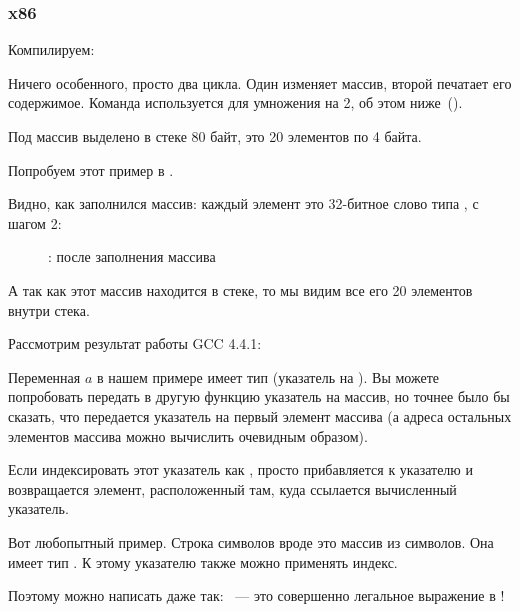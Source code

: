 \subsubsection{x86}


Компилируем:



Ничего особенного, просто два цикла. Один изменяет массив, второй печатает его содержимое. 
Команда  используется для умножения \ECX на 2, об этом ниже~().

Под массив выделено в стеке 80 байт, это 20 элементов по 4 байта.

\clearpage
Попробуем этот пример в \olly.
\myindex{\olly}

Видно, как заполнился массив: каждый элемент это 32-битное слово типа \Tint, с шагом 2:

\begin{figure}[H]
\centering
{}
\caption{\olly: после заполнения массива}
\label{fig:array_simple_olly}
\end{figure}

А так как этот массив находится в стеке, то мы видим все его 20 элементов внутри стека.


Рассмотрим результат работы GCC 4.4.1:



Переменная $a$ в нашем примере имеет тип  (указатель на \Tint{}).
Вы можете попробовать передать в другую функцию указатель на массив,
но точнее было бы сказать, что передается указатель на первый элемент массива
(а адреса остальных элементов массива можно вычислить очевидным образом).

Если индексировать этот указатель как ,  просто прибавляется к указателю 
и возвращается элемент, расположенный там, куда ссылается вычисленный указатель.

Вот любопытный пример. Строка символов вроде  это массив из символов. 
Она имеет тип .
К этому указателю также можно применять индекс.

Поэтому можно написать даже так:  ~--- это совершенно легальное выражение в \CCpp!

